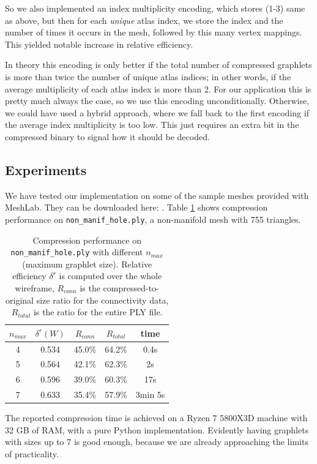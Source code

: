 \documentclass{egpubl}
\begin{document}
So we also implemented an index multiplicity encoding, which stores (1-3) same as above, but then for each \textit{unique} atlas index, we store the index and the number of times it occurs in the mesh, followed by this many vertex mappings. This yielded notable increase in relative efficiency. %

In theory this encoding is only better if the total number of compressed graphlets is more than twice the number of unique atlas indices; in other words, if the average multiplicity of each atlas index is more than 2. For our application this is pretty much always the case, so we use this encoding unconditionally. Otherwise, we could have used a hybrid approach, where we fall back to the first encoding if the average index multiplicity is too low. This just requires an extra bit in the compressed binary to signal how it should be decoded.

\subsection{Experiments}

We have tested our implementation on some of the sample meshes provided with MeshLab. They can be downloaded here: .
Table \ref{tab:compression_nonmanif} shows compression performance on \texttt{non\_manif\_hole.ply}, a non-manifold mesh with 755 triangles.
\begin{table}
        \centering
        \begin{tabular}{|c|c|c|c|c|}
        \hline
        $n_{max}$ & $\delta^r(W)$ & $R_{conn}$ & $R_{total}$ & time \\
        \hline
        4 & 0.534 & 45.0\% & 64.2\% & 0.4s \\
        5 & 0.564 & 42.1\% & 62.3\% & 2s \\
        6 & 0.596 & 39.0\% & 60.3\% & 17s \\
        7 & 0.633 & 35.4\% & 57.9\% & 3min 5s \\
        \hline
\end{tabular}
\caption{Compression performance on \texttt{non\_manif\_hole.ply} with different $n_{max}$ (maximum graphlet size). Relative efficiency $\delta^r$ is computed over the whole wireframe, $R_{conn}$ is the compressed-to-original size ratio for the connectivity data, $R_{total}$ is the ratio for the entire PLY file.}
\label{tab:compression_nonmanif}
\end{table}
The reported compression time is achieved on a Ryzen 7 5800X3D machine with 32 GB of RAM,
with a pure Python implementation.
Evidently having graphlets with sizes up to 7 is good enough, because we are already approaching the limits of practicality.
\end{document}

